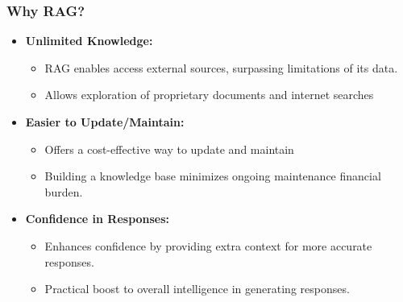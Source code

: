 \begin{frame}[fragile]\frametitle{Why RAG?}
\begin{itemize}
  \item \textbf{Unlimited Knowledge:}
    \begin{itemize}
      \item RAG enables access external sources, surpassing limitations of its data.
      \item Allows exploration of proprietary documents and internet searches%
    \end{itemize}
  
  \item \textbf{Easier to Update/Maintain:}
    \begin{itemize}
      \item Offers a cost-effective way to update and maintain %
      \item Building a knowledge base minimizes ongoing maintenance financial burden.
    \end{itemize}
	
  \item \textbf{Confidence in Responses:}
    \begin{itemize}
      \item Enhances confidence by providing extra context for more accurate responses.
      \item Practical boost to overall intelligence in generating responses.
    \end{itemize}	





\end{itemize}
\end{frame}
